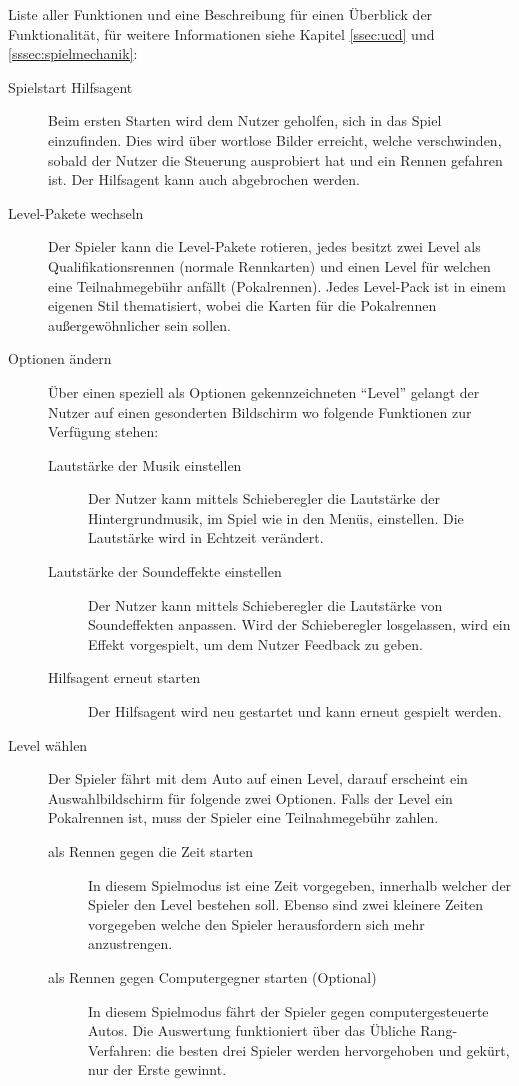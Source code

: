 	Liste aller Funktionen und eine Beschreibung für einen Überblick der Funktionalität, für weitere Informationen siehe Kapitel \ref{ssec:ucd} und \ref{sssec:spielmechanik}:
	\begin{description}
		\item[Spielstart Hilfsagent]{ Beim ersten Starten wird dem Nutzer geholfen, sich in das Spiel einzufinden. Dies wird über wortlose Bilder erreicht, welche verschwinden, sobald der Nutzer die Steuerung ausprobiert hat und ein Rennen gefahren ist. Der Hilfsagent kann auch abgebrochen werden. }
		\item[Level-Pakete wechseln]{
			Der Spieler kann die Level-Pakete rotieren, jedes besitzt zwei Level als Qualifikationsrennen (normale Rennkarten) und einen Level für welchen eine Teilnahmegebühr anfällt (Pokalrennen).
			Jedes Level-Pack ist in einem eigenen Stil thematisiert, wobei die Karten für die Pokalrennen außergewöhnlicher sein sollen.
		}
		\item[Optionen ändern]{ Über einen speziell als Optionen gekennzeichneten \enquote{Level} gelangt der Nutzer auf einen gesonderten Bildschirm wo folgende Funktionen zur Verfügung stehen:
			\begin{description}
				\item[Lautstärke der Musik einstellen]{ Der Nutzer kann mittels Schieberegler die Lautstärke der Hintergrundmusik, im Spiel wie in den Menüs, einstellen. Die Lautstärke wird in Echtzeit verändert. }
				\item[Lautstärke der Soundeffekte einstellen]{ Der Nutzer kann mittels Schieberegler die Lautstärke von Soundeffekten anpassen. Wird der Schieberegler losgelassen, wird ein Effekt vorgespielt, um dem Nutzer Feedback zu geben.}
				\item[Hilfsagent erneut starten]{ Der Hilfsagent wird neu gestartet und kann erneut gespielt werden.}
			\end{description}
		}
		\item[Level wählen]{ Der Spieler fährt mit dem Auto auf einen Level, darauf erscheint ein Auswahlbildschirm für folgende zwei Optionen. Falls der Level ein Pokalrennen ist, muss der Spieler eine Teilnahmegebühr zahlen.
			\begin{description}
				\item[als Rennen gegen die Zeit starten]{ In diesem Spielmodus ist eine Zeit vorgegeben, innerhalb welcher der Spieler den Level bestehen soll. Ebenso sind zwei kleinere Zeiten vorgegeben welche den Spieler herausfordern sich mehr anzustrengen. }
				\item[als Rennen gegen Computergegner starten (Optional)]{ In diesem Spielmodus fährt der Spieler gegen computergesteuerte Autos. Die Auswertung funktioniert über das Übliche Rang-Verfahren: die besten drei Spieler werden hervorgehoben und gekürt, nur der Erste gewinnt.}

\end{description}}
\end{description}

